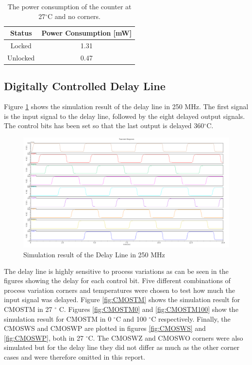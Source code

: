 \documentclass[a4paper,12pt]{article} \usepackage{graphicx}
\newcommand{\degree}{\ensuremath{^\circ}}
\begin{document}
\begin{table}[h]
        \centering
        \begin{tabular}{|c|c|}
                \hline
                \textbf{Status} & \textbf{Power Consumption [mW]}\\
                \hline
                Locked & 1.31\\
                Unlocked & 0.47\\
                \hline
        \end{tabular}
        \caption{The power consumption of the counter at 27$\degree$C and no corners.}
        \label{tab:counter_lock}
\end{table}

\subsection{Digitally Controlled Delay Line}
Figure \ref{fig:delay_white} shows the simulation result of the delay line in
250 MHz. The first signal is the input signal to the delay line, followed by the
eight delayed output signals. The control bits has been set so that the last
output is delayed 360\degree C. 
\begin{figure}[h]
        \centering
        \includegraphics[width=\textwidth]{../Bilder/Delay_Line/delay_trans_sim_white.png}
        \caption{Simulation result of the Delay Line in 250 MHz}
        \label{fig:delay_white}
\end{figure}

The delay line is highly sensitive to process variations as can be
seen in the figures showing the delay for each control bit. Five
different combinations of process variation corners and temperatures
were chosen to test how much the input signal was delayed. Figure
\ref{fig:CMOSTM} shows the simulation result for CMOSTM in 27 \degree
C. Figures \ref{fig:CMOSTM0} and \ref{fig:CMOSTM100} show the
simulation result for CMOSTM in 0 \degree C and 100 \degree C
respectively.  Finally, the CMOSWS and CMOSWP are plotted in figures
\ref{fig:CMOSWS} and \ref{fig:CMOSWP}, both in 27 \degree C. The
CMOSWZ and CMOSWO corners were also simulated but for the delay line
they did not differ as much as the other corner cases and were
therefore omitted in this report.
\end{document}
